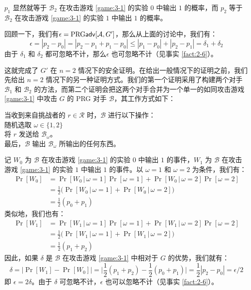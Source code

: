\vspace*{5pt}

\noindent
$p_1$ 显然就等于 $\mathcal B_2$ 在攻击游戏 \ref{game:3-1} 的实验 $0$ 中输出 $1$ 的概率，而 $p_2$ 等于 $\mathcal B_2$ 在攻击游戏 \ref{game:3-1} 的实验 $1$ 中输出 $1$ 的概率。

回顾一下，我们有$\epsilon={\rm PRG\mathsf{adv}}[\mathcal{A},G']$，那么从上面的讨论中，我们有：
$$
\epsilon=|p_2-p_0|=|p_2-p_1+p_1-p_0|\leq|p_1-p_0|+|p_2-p_1|=\delta_1+\delta_2
$$
由于 $\delta_1$ 和 $\delta_2$ 都可忽略不计，那么$\epsilon$ 也可忽略不计（见事实 \ref{fact:2-6}）。

这就完成了 $G'$ 在 $n=2$ 情况下的安全证明。在给出一般情况下的证明之前，我们先给出 $n=2$ 情况下的另一种证明方式。我们的第一个证明采用了构建两个对手 $\mathcal B_1$ 和 $\mathcal B_2$ 的方法，而第二个证明会把这两个对手合并为一个单一的如同攻击游戏 \ref{game:3-1} 中攻击 $G$ 的 PRG 对手 $\mathcal B$，其工作方式如下：

\vspace*{5pt}

\hspace*{5pt} 当收到来自挑战者的 $r\in\mathcal R$ 时，$\mathcal B$ 进行以下操作：\\
\hspace*{50pt} 随机选取 $\omega\in\{1,2\}$\\
\hspace*{50pt} 将 $r$ 发送给 $\mathcal B_\omega$。\\
\hspace*{26pt} 最后，$\mathcal B$ 输出 $\mathcal B_\omega$ 所输出的任何东西。

\vspace*{5pt}

记 $W_0$ 为 $\mathcal B$ 在攻击游戏 \ref{game:3-1} 的实验 $0$ 中输出 $1$ 的事件，$W_1$ 为 $\mathcal B$ 在攻击游戏 \ref{game:3-1} 的实验 $1$ 中输出 $1$ 的事件。以 $\omega=1$ 和 $\omega=2$ 为条件，我们有：
$$
\begin{aligned}
\Pr[W_0]
&=\Pr[W_0\,|\,\omega=1]\Pr[\omega=1]+\Pr[W_0\,|\,\omega=2]\Pr[\omega=2]\\
&=\frac{1}{2}\Big(\Pr[W_0\,|\,\omega=1]+\Pr[W_0\,|\,\omega=2]\Big)\\
&=\frac{1}{2}(p_0+p_1)
\end{aligned}
$$
类似地，我们也有：
$$
\begin{aligned}
\Pr[W_1]
&=\Pr[W_1\,|\,\omega=1]\Pr[\omega=1]+\Pr[W_1\,|\,\omega=2]\Pr[\omega=2]\\
&=\frac{1}{2}\Big(\Pr[W_1\,|\,\omega=1]+\Pr[W_1\,|\,\omega=2]\Big)\\
&=\frac{1}{2}(p_1+p_2)
\end{aligned}
$$
因此，如果 $\delta$ 是 $\mathcal B$ 在攻击游戏 \ref{game:3-1} 中相对于 $G$ 的优势，我们就有：
$$
\delta=\big\lvert\Pr[W_1]-\Pr[W_0]\big\rvert
=\bigg\lvert\frac{1}{2}(p_1+p_2)-\frac{1}{2}(p_0+p_1)\bigg\lvert
=\frac{1}{2}|p_2-p_0|
={\epsilon}/{2}
$$
即 $\epsilon=2\delta$。由于 $\delta$ 可忽略不计，$\epsilon$ 也可以忽略不计（见事实 \ref{fact:2-6}）。

